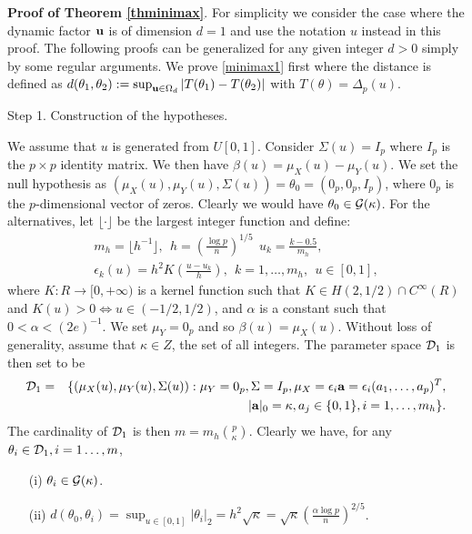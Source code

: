 \documentclass[11pt]{article}
\theoremstyle{definition}
\begin{document}
 
 
 
 \noindent
 {\bf Proof of Theorem \ref{thminimax}}.
 For simplicity we consider the case where the dynamic factor ${\bf u}$ is of dimension $d=1$ and use the notation $u$ instead in this proof. The following proofs can be generalized for any given integer $d>0$ simply by some regular arguments. We prove \eqref{minimax1} first where the distance is defined as $d(\theta_1,\theta_2):=\sup_{{\bf u}\in \Omega_d}|T(\theta_1)-T(\theta_2)|$ with $T(\theta)=\Delta_p(u)$.
 
 \noindent
 {\sc Step 1}. Construction of the hypotheses.
 
 \noindent
 We assume that ${ u}$ is generated from $U[0,1]$.
 Consider $\Sigma({ u})=I_p$ where $I_p$ is the $p\times p$ identity matrix. We then have $\beta({u})=\mu_X({u})-\mu_Y({ u})$. We set the null hypothesis as $(\mu_X(u),\mu_Y(u),\Sigma(u))=\theta_0=(0_p,0_p, I_p)$, where $0_p$ is the $p$-dimensional vector
 of zeros. %
 Clearly we would have $\theta_0\in {\cal G}(\kappa)$. For the alternatives, let $\lfloor \cdot\rfloor$ be the largest integer function and define:
 \begin{eqnarray*}\label{alt0}
 	m_h=\lfloor h^{-1}\rfloor,~~    h= \left( \frac{ \log p }{n }\right)^{1/5}~~  u_k=\frac{k-0.5}{m_h}, \nonumber\\
 	\epsilon_k(u)=h^2K\left(\frac{u-u_k}{h}\right),~~ k=1,\ldots, m_h, ~~u\in[0,1],
 \end{eqnarray*}
 where $K: R\rightarrow [0,+\infty)$ is a kernel function such that $K\in H(2,1/2)\cap C^{\infty}(R)$ and $K(u)>0 \iff u\in(-1/2,1/2)$, and $\alpha$ is a constant such that $0<\alpha<(2e)^{-1}$.
 We set $\mu_Y=0_p$ and so $\beta(u)=\mu_X(u)$. Without loss of generality, assume that $\kappa\in Z$, the set of all integers. The parameter space ${\cal D}_1$ is then set to be
 \begin{eqnarray*}
 	{\cal D}_1&=&\{(\mu_X(u),\mu_Y(u),\Sigma(u)): \mu_Y=0_p,\Sigma=I_p, \mu_X=\epsilon_i{\bf a}
 	=\epsilon_i(a_1,\ldots,a_p)^T,\\
 	&& |{\bf a} |_0=  \kappa, a_j\in \{0,1\}, i=1,\ldots,m_h \}.
 \end{eqnarray*}
 The cardinality of ${\cal D}_1$ is then $m=m_h\binom p\kappa$. Clearly we have, for any $\theta_i \in {\cal D}_1, i=1\ldots, m$,
 \begin{itemize}
 	\item[(i)] $\theta_i\in {\cal G}(\kappa)$.
 	\item[(ii)] $d(\theta_0,\theta_i)=\sup_{u\in [0,1]}|\theta_i|_2=h^2\sqrt{\kappa}=\sqrt{\kappa} \left(  \frac{\alpha \log p }{n }\right)^{2/5}$.
 \end{itemize}
 
\end{document}
